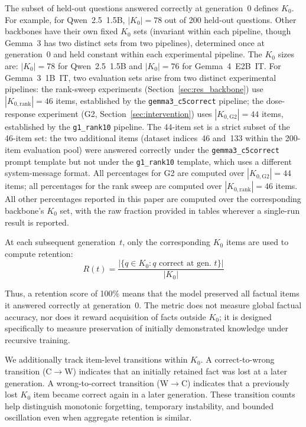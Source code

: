 \documentclass[a4paper,fleqn]{cas-dc}
\newif\ifshowchanges
\newcommand{\rev}[1]{\ifshowchanges{\color{blue}#1}\else{#1}\fi}
\begin{document}
The subset of held-out questions answered correctly at generation~0 defines
$K_0$. For example, for Qwen~2.5~1.5B, $|K_0|=78$ out of 200 held-out
questions. Other backbones have their own fixed $K_0$ sets (invariant within each pipeline, though Gemma~3 has two distinct sets from two pipelines), determined once at
generation~0 and \rev{held constant within each experimental pipeline}.
\rev{The $K_0$ sizes are: $|K_0|=78$ for Qwen~2.5~1.5B and $|K_0|=76$ for
Gemma~4~E2B~IT. For Gemma~3~1B~IT, two evaluation sets arise from two distinct
experimental pipelines: the \rev{rank-sweep experiments}
(Section~\ref{sec:res_backbone}) use $|K_{0,\mathrm{rank}}|=46$ items, established
by the \texttt{gemma3\_c5correct} pipeline; the dose-response experiment (G2,
Section~\ref{sec:intervention}) uses $|K_{0,\mathrm{G2}}|=44$ items, established
by the \texttt{g1\_rank10} pipeline. The 44-item set is a strict subset of the
46-item set: the two additional items (dataset indices~46 and~133 within the
200-item evaluation pool) were answered correctly under the
\texttt{gemma3\_c5correct} prompt template but not under the \texttt{g1\_rank10}
template, which uses a different system-message format. All percentages for G2 are
computed over $|K_{0,\mathrm{G2}}|=44$ items; all percentages for the rank sweep
are computed over $|K_{0,\mathrm{rank}}|=46$ items. All other percentages reported
in this paper are computed over the corresponding backbone's $K_0$ set, with
the raw fraction provided in tables wherever a single-run result is reported.}

At each subsequent generation~$t$, only the corresponding $K_0$ items are used
to compute retention:
\begin{equation}\label{eq:k0}
  \rev{R(t)} =
  \frac{|\{q \in K_0 : q \text{ correct at gen.\ } t\}|}{|K_0|}
\end{equation}

Thus, a retention score of 100\% means that the model preserved all factual
items it answered correctly at generation~0. The metric does not measure global
factual accuracy, nor does it reward acquisition of facts outside $K_0$; it is
designed specifically to measure preservation of initially demonstrated
knowledge under recursive training.

We additionally track item-level transitions within $K_0$. A
correct-to-wrong transition (C$\to$W) indicates that an initially retained fact
was lost at a later generation. A wrong-to-correct transition (W$\to$C)
indicates that a previously lost $K_0$ item became correct again in a later
generation. These transition counts help distinguish monotonic forgetting,
temporary instability, and bounded oscillation even when aggregate retention is
similar.
\end{document}
